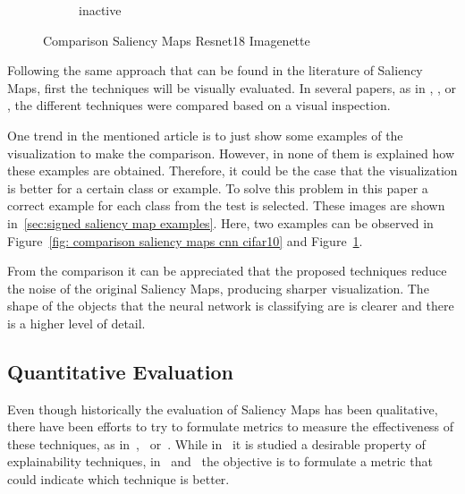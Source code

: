 \documentclass[preprint,12pt]{elsarticle}
\begin{document}
\begin{figure}
\begin{subfigure}{0.14\textwidth}
        \caption{inactive}
    \end{subfigure}
    \caption{Comparison Saliency Maps Resnet18 Imagenette}
    \label{fig: comparison saliency maps resnet18 imagenette}
\end{figure}

Following the same approach that can be found in the literature of Saliency Maps, first the techniques will be visually evaluated. In several papers, as in \cite{simonyanDeepConvolutionalNetworks2014a}, \cite{springenbergStrivingSimplicityAll2015}, \cite{smilkovSmoothGradRemovingNoise} or \cite{sundararajanAxiomaticAttributionDeep2017}, the different techniques were compared based on a visual inspection. 

One trend in the mentioned article is to just show some examples of the visualization to make the comparison. However, in none of them is explained how these examples are obtained. Therefore, it could be the case that the visualization is better for a certain class or example. To solve this problem in this paper a correct example for each class from the test is selected. These images are shown in~\ref{sec:signed saliency map examples}. Here, two examples can be observed in Figure~\ref{fig: comparison saliency maps cnn cifar10} and Figure~\ref{fig: comparison saliency maps resnet18 imagenette}.

From the comparison it can be appreciated that the proposed techniques reduce the noise of the original Saliency Maps, producing sharper visualization. The shape of the objects that the neural network is classifying are is clearer and there is a higher level of detail.

\subsection{Quantitative Evaluation}

Even though historically the evaluation of Saliency Maps has been qualitative, there have been efforts to try to formulate metrics to measure the effectiveness of these techniques, as in~\cite{petsiukRISERandomizedInput},~\cite{hookerBenchmarkInterpretabilityMethods2019} or~\cite{anconaBetterUnderstandingGradientbased2018}. While in~\cite{anconaBetterUnderstandingGradientbased2018} it is studied a desirable property of explainability techniques, in~\cite{petsiukRISERandomizedInput} and~\cite{hookerBenchmarkInterpretabilityMethods2019} the objective is to formulate a metric that could indicate which technique is better. 
\end{document}
